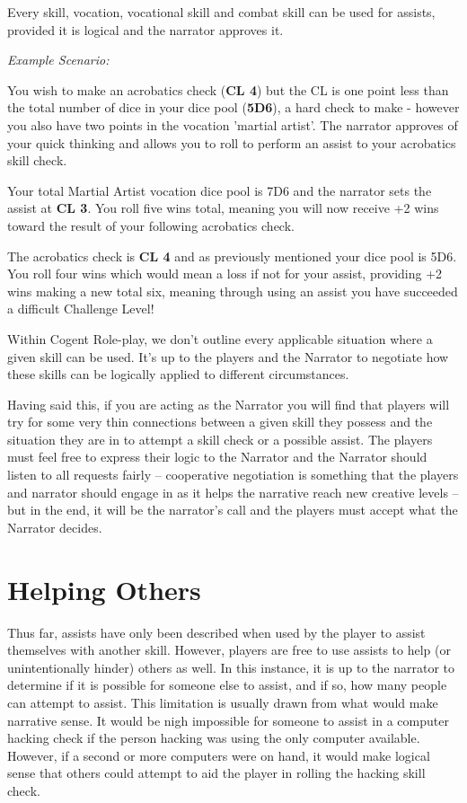 Every skill, vocation, vocational skill and combat skill can be used for assists, provided it is logical and the narrator approves it.

\textit{Example Scenario:}

\begin{displayquote}
    You wish to make an acrobatics check (\textbf{CL 4}) but the CL is one point less than the total number of dice in your dice pool (\textbf{5D6}), a hard check to make - however you also have two points in the vocation 'martial artist'. The narrator approves of your quick thinking and allows you to roll to perform an assist to your acrobatics skill check.

    Your total Martial Artist vocation dice pool is 7D6 and the narrator sets the assist at \textbf{CL 3}. You roll five wins total, meaning you will now receive +2 wins toward the result of your following acrobatics check.

    The acrobatics check is \textbf{CL 4} and as previously mentioned your dice pool is 5D6. You roll four wins which would mean a loss if not for your assist, providing +2 wins making a new total six, meaning through using an assist you have succeeded a difficult Challenge Level!
\end{displayquote}

Within Cogent Role-play, we don’t outline every applicable situation where a given skill can be used. It’s up to the players and the Narrator to negotiate how these skills can be logically applied to different circumstances.

Having said this, if you are acting as the Narrator you will find that players will try for some very thin connections between a given skill they possess and the situation they are in to attempt a skill check or a possible assist. The players must feel free to express their logic to the Narrator and the Narrator should listen to all requests fairly – cooperative negotiation is something that the players and narrator should engage in as it helps the narrative reach new creative levels – but in the end, it will be the narrator’s call and the players must accept what the Narrator decides.

\section{Helping Others} \label{sec:helping_others}

Thus far, assists have only been described when used by the player to assist themselves with another skill. However, players are free to use assists to help (or unintentionally hinder) others as well. In this instance, it is up to the narrator to determine if it is possible for someone else to assist, and if so, how many people can attempt to assist. This limitation is usually drawn from what would make narrative sense. It would be nigh impossible for someone to assist in a computer hacking check if the person hacking was using the only computer available. However, if a second or more computers were on hand, it would make logical sense that others could attempt to aid the player in rolling the hacking skill check.

